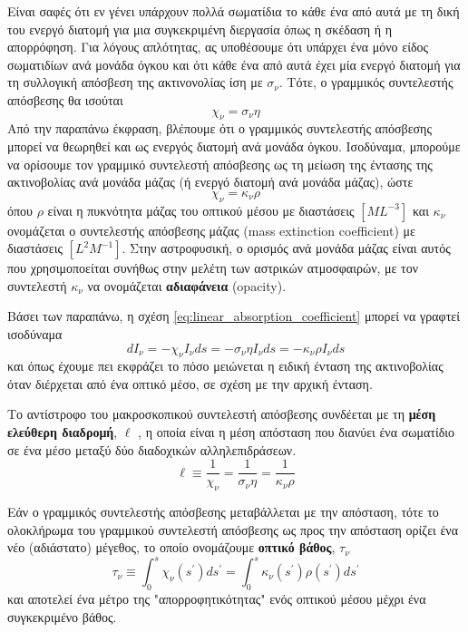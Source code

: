 Είναι σαφές ότι εν γένει υπάρχουν πολλά σωματίδια το κάθε ένα από αυτά με τη δική του ενεργό διατομή για μια συγκεκριμένη διεργασία όπως η σκέδαση ή η απορρόφηση. Για λόγους απλότητας, ας υποθέσουμε ότι υπάρχει ένα μόνο είδος σωματιδίων ανά μονάδα όγκου και ότι κάθε ένα από αυτά έχει μία ενεργό διατομή για τη συλλογική απόσβεση της ακτινονολίας ίση με $\sigma_{\nu}$. Τότε, ο γραμμικός συντελεστής απόσβεσης θα ισούται 
\begin{equation}
    \label{eq:atomic_absorption_coefficient}
    \chi_{\nu} = \sigma_{\nu} \eta
\end{equation}
Από την παραπάνω έκφραση, βλέπουμε ότι ο γραμμικός συντελεστής απόσβεσης μπορεί να θεωρηθεί και ως ενεργός διατομή ανά μονάδα όγκου. Ισοδύναμα, μπορούμε να ορίσουμε τον γραμμικό συντελεστή απόσβεσης ως τη μείωση της έντασης της ακτινοβολίας ανά μονάδα μάζας (ή ενεργό διατομή ανά μονάδα μάζας), ώστε
\begin{equation}
    \label{eq:mass_extinction_coefficient}
    \chi_{\nu} = \kappa_{\nu} \rho
\end{equation}
όπου $\rho$ είναι η πυκνότητα μάζας του οπτικού μέσου με διαστάσεις $[M L^{-3}]$ και $\kappa_{\nu}$ ονομάζεται ο συντελεστής απόσβεσης μάζας (mass extinction coefficient) με διαστάσεις $[L^2 M^{-1}]$. Στην αστροφυσική, ο ορισμός ανά μονάδα μάζας είναι αυτός που χρησιμοποείται συνήθως στην μελέτη των αστρικών ατμοσφαιρών, με τον συντελεστή $\kappa_{\nu}$ να ονομάζεται \textbf{αδιαφάνεια} (opacity).

Βάσει των παραπάνω, η σχέση \eqref{eq:linear_absorption_coefficient} μπορεί να γραφτεί ισοδύναμα
\begin{equation}
    \label{eq:radiative_equation_extinction}
    \boxed{dI_{\nu} = - \chi_{\nu} I_{\nu} ds = - \sigma_{\nu} \eta I_{\nu} ds = - \kappa_{\nu} \rho I_{\nu} ds}
\end{equation}
και όπως έχουμε πει εκφράζει το πόσο μειώνεται η ειδική ένταση της ακτινοβολίας όταν διέρχεται από ένα οπτικό μέσο, σε σχέση με την αρχική ένταση.

Το αντίστροφο του μακροσκοπικού συντελεστή απόσβεσης συνδέεται με τη \textbf{μέση ελεύθερη διαδρομή}, $\ell$ , η οποία είναι η μέση απόσταση που διανύει ένα σωματίδιο σε ένα μέσο μεταξύ δύο διαδοχικών αλληλεπιδράσεων.
\begin{equation}
    \label{eq:mean_free_path}
    \ell \equiv \frac{1}{\chi_{\nu}} = \frac{1}{\sigma_{\nu} \eta} = \frac{1}{\kappa_{\nu} \rho}
\end{equation}

Εάν ο γραμμικός συντελεστής απόσβεσης μεταβάλλεται με την απόσταση, τότε το ολοκλήρωμα του γραμμικού συντελεστή απόσβεσης ως προς την απόσταση ορίζει ένα νέο (αδιάστατο) μέγεθος, το οποίο ονομάζουμε \textbf{οπτικό βάθος}, $\tau_{\nu}$
\begin{equation}
    \label{eq:optical_depth}
    \tau_{\nu} \equiv \int_{0}^{s} \chi_{\nu}(s^{\prime}) ds^{\prime} = \int_{0}^{s} \kappa_{\nu}(s^{\prime}) \rho(s^{\prime}) ds^{\prime} 
\end{equation}
και αποτελεί ένα μέτρο της "απορροφητικότητας" ενός οπτικού μέσου μέχρι ένα συγκεκριμένο βάθος.





